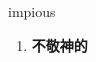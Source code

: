 
\begin{frame}
{\huge impious}
\begin{center}
\begin{enumerate}\Large
  \item \textbf{不敬神的}
\end{enumerate}
\end{center}
\end{frame}
